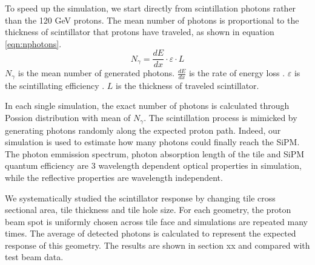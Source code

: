 \documentclass[a4paper,11pt]{article}
\begin{document}
To speed up the simulation, we start directly from scintillation photons rather than the 120 GeV protons.
The mean number of photons is proportional to the thickness of scintillator that protons have traveled, 
as shown in equation \ref{eqn:nphotons}. 
\begin{equation}
\label{eqn:nphotons}
    N_{\gamma}=\frac{d E}{d x} \cdot \varepsilon \cdot L
\end{equation}
$N_{\gamma}$ is the mean number of generated photons.
$\frac{d E}{d x}$ is the rate of energy loss \cite{pdgdata}.
$\varepsilon$ is the scintillating efficiency \cite{scinti_eff}.
$L$ is the thickness of traveled scintillator.


In each single simulation, 
the exact number of photons is calculated through Possion distribution with mean of $N_{\gamma}$.
The scintillation process is mimicked by generating photons randomly along the expected proton path. 
Indeed, our simulation is used to estimate how many photons could finally reach the SiPM.
The photon emmission spectrum, photon absorption length of the tile and SiPM quantum efficiency are 3 wavelength dependent optical properties in simulation,
while the reflective properties are wavelength independent.

We systematically studied the scintillator response 
by changing tile cross sectional area, tile thickness and tile hole size.
For each geometry, the proton beam spot is uniformly chosen across tile face and simulations are repeated many times.
The average of detected photons is calculated to represent the expected response of this geometry.
The results are shown in section xx and compared with test beam data.
\end{document}
